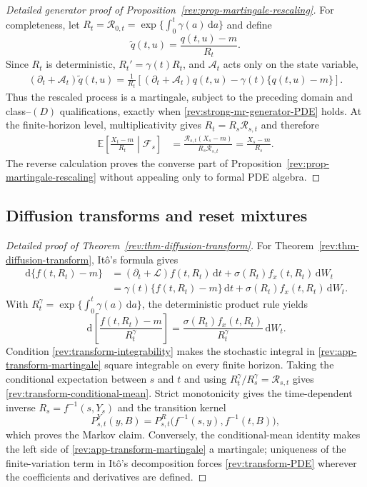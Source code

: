 \documentclass[11pt]{article}
\theoremstyle{remark}
\newcommand{\E}{\mathbb E}
\newcommand{\dd}{\,\mathrm d}
\begin{document}
\begin{proof}[Detailed generator proof of
Proposition~\ref{rev:prop-martingale-rescaling}]
For completeness, let
$R_t=\mathcal R_{0,t}=\exp\{\int_0^t\gamma(a)\dd a\}$ and define
\[
\widetilde q(t,u)=\frac{q(t,u)-m}{R_t}.
\]
Since $R_t$ is deterministic, $R_t'=\gamma(t)R_t$, and
$\mathcal A_t$ acts only on the state variable,
\begin{align}
(\partial_t+\mathcal A_t)\widetilde q(t,u)
=\frac{1}{R_t}
\left[(\partial_t+\mathcal A_t)q(t,u)
-\gamma(t)\{q(t,u)-m\}\right].
\label{rev:app-rescaled-generator}
\end{align}
Thus the rescaled process is a martingale, subject to the preceding domain and
class--$(D)$ qualifications, exactly when
\eqref{rev:strong-mr-generator-PDE} holds.  At the finite-horizon level,
multiplicativity gives $R_t=R_s\mathcal R_{s,t}$ and therefore
\begin{align*}
\E\!\left[\frac{X_t-m}{R_t}\middle|\mathcal F_s\right]
&=\frac{\mathcal R_{s,t}(X_s-m)}{R_s\mathcal R_{s,t}}
=\frac{X_s-m}{R_s}.
\end{align*}
The reverse calculation proves the converse part of
Proposition~\ref{rev:prop-martingale-rescaling} without appealing only to formal PDE
algebra.
\end{proof}

\subsection{Diffusion transforms and reset mixtures}
\label{rev:app-transform-reset-proofs}

\begin{proof}[Detailed proof of Theorem~\ref{rev:thm-diffusion-transform}]
For Theorem~\ref{rev:thm-diffusion-transform}, It\^o's formula gives
\begin{align*}
\dd\{f(t,R_t)-m\}
&=(\partial_t+\mathcal L)f(t,R_t)\dd t
  +\sigma(R_t)f_x(t,R_t)\dd W_t\\
&=\gamma(t)\{f(t,R_t)-m\}\dd t
  +\sigma(R_t)f_x(t,R_t)\dd W_t.
\end{align*}
With $R_t^\gamma=\exp\{\int_0^t\gamma(a)\dd a\}$, the deterministic product
rule yields
\begin{equation}
\dd\!\left[\frac{f(t,R_t)-m}{R_t^\gamma}\right]
=\frac{\sigma(R_t)f_x(t,R_t)}{R_t^\gamma}\dd W_t.
\label{rev:app-transform-martingale}
\end{equation}
Condition \eqref{rev:transform-integrability} makes the stochastic integral in
\eqref{rev:app-transform-martingale} square integrable on every finite
horizon.  Taking the conditional expectation between $s$ and $t$ and using
$R_t^\gamma/R_s^\gamma=\mathcal R_{s,t}$ gives
\eqref{rev:transform-conditional-mean}.  Strict monotonicity gives the
time-dependent inverse $R_s=f^{-1}(s,Y_s)$ and the transition kernel
\[
P^Y_{s,t}(y,B)
=P^R_{s,t}\bigl(f^{-1}(s,y),f^{-1}(t,B)\bigr),
\]
which proves the Markov claim.  Conversely, the conditional-mean identity
makes the left side of \eqref{rev:app-transform-martingale} a martingale;
uniqueness of the finite-variation term in It\^o's decomposition forces
\eqref{rev:transform-PDE} wherever the coefficients and derivatives are
defined.
\end{proof}
\end{document}
